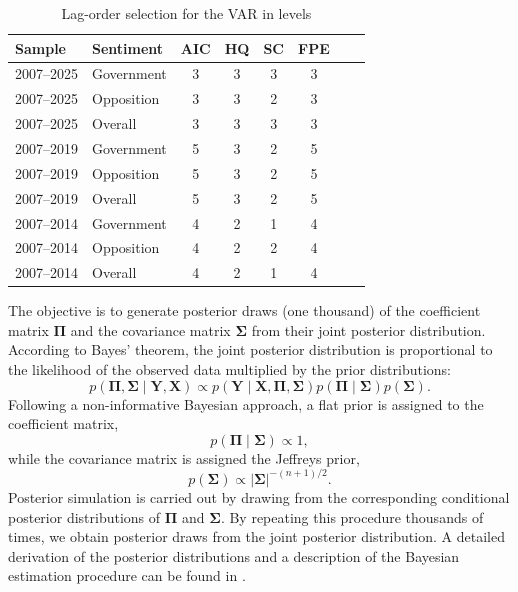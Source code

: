 \documentclass[12pt]{scrartcl}
\numberwithin{equation}{section}				%
\begin{document}
     \begin{table}[htbp]
     	\centering
     	\begin{threeparttable}
     		\caption{Lag-order selection for the VAR in levels}
     		\label{tab:lags}
     		\begin{tabular}{llcccccc}
     			\toprule
     			Sample & Sentiment & AIC & HQ & SC & FPE \\
     			\midrule
     			2007--2025 & Government    & 3 & 3 & 3 & 3 \\
     			2007--2025 & Opposition    & 3 & 3 & 2 & 3 \\
     			2007--2025 & Overall       & 3 & 3 & 3 & 3 \\
     			\midrule
     			2007--2019 & Government & 5 & 3 & 2 & 5 \\
     			2007--2019 & Opposition & 5 & 3 & 2 & 5 \\
     			2007--2019 & Overall    & 5 & 3 & 2 & 5 \\
     			\midrule
     			2007--2014 & Government & 4 & 2 & 1 & 4 \\
     			2007--2014 & Opposition & 4 & 2 & 2 & 4 \\
     			2007--2014 & Overall    & 4 & 2 & 1 & 4 \\
     			\bottomrule
     		\end{tabular}
     	\end{threeparttable}
     \end{table}
     
     The objective is to generate posterior draws (one thousand) of the coefficient matrix $\mathbf{\Pi}$ and the covariance matrix $\boldsymbol{\Sigma}$ from their joint posterior distribution. According to Bayes' theorem, the joint posterior distribution is proportional to the likelihood of the observed data multiplied by the
     prior distributions:
     \begin{equation}
     	p(\mathbf{\Pi},\boldsymbol{\Sigma}
     	\mid
     	\mathbf{Y},\mathbf{X})
     	\propto
     	p(\mathbf{Y}
     	\mid
     	\mathbf{X},\mathbf{\Pi},\boldsymbol{\Sigma})
     	p(\mathbf{\Pi}\mid\boldsymbol{\Sigma})
     	p(\boldsymbol{\Sigma}).
     \end{equation}
     Following a non-informative Bayesian approach, a flat prior is assigned to
     the coefficient matrix,
     \begin{equation}
     	p(\mathbf{\Pi}\mid\boldsymbol{\Sigma})
     	\propto
     	1,
     \end{equation}
     while the covariance matrix is assigned the Jeffreys prior,
     \begin{equation}
     	p(\boldsymbol{\Sigma})
     	\propto
     	|\boldsymbol{\Sigma}|^{-(n+1)/2}.
     \end{equation}
     Posterior simulation is carried out by drawing from the corresponding
     conditional posterior distributions of $\mathbf{\Pi}$ and
     $\boldsymbol{\Sigma}$. By repeating this procedure thousands of times, we obtain posterior draws from the joint posterior distribution. A detailed derivation of the
     posterior distributions and a description of the Bayesian estimation
     procedure can be found in \textcite{maffei2021does}.
   
\end{document}
